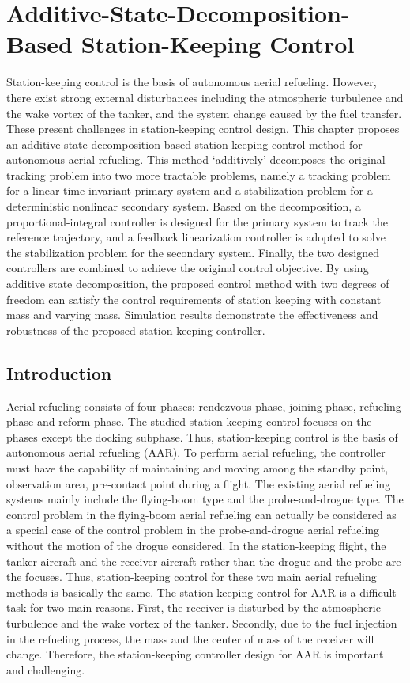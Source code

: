
\chapter{ Additive-State-Decomposition-Based Station-Keeping Control}

Station-keeping control is the basis of autonomous aerial refueling. However, there exist strong external disturbances including the atmospheric turbulence and the wake vortex of the
tanker, and the system change caused by the fuel transfer. These present challenges in station-keeping control design. This chapter proposes an additive-state-decomposition-based station-keeping control method for autonomous aerial refueling. This method `additively' decomposes the original tracking
problem into two more tractable problems, namely a tracking problem for a linear time-invariant primary system and a stabilization problem for a deterministic nonlinear secondary system. Based on the decomposition, a
proportional-integral controller is designed for the primary system to track the
reference trajectory, and a feedback linearization controller is adopted to solve the stabilization problem for the secondary system. Finally, the two
designed controllers are combined to achieve the original control objective. By using
additive state decomposition, the proposed control method with two degrees of freedom
can satisfy the control requirements of station keeping with constant mass and varying mass. Simulation results demonstrate the effectiveness and robustness of the proposed station-keeping controller.

\section{Introduction}

Aerial refueling consists of four
phases: rendezvous phase, joining phase, refueling phase and reform phase. The studied station-keeping control focuses on the phases except the docking subphase. Thus, station-keeping control is the
basis of autonomous aerial refueling (AAR). To perform aerial refueling, the
controller must have the capability of maintaining and moving among the
standby point, observation area, pre-contact point during a flight. The
existing aerial refueling systems mainly include the flying-boom type and the probe-and-drogue type. The control problem in
the flying-boom aerial refueling can actually be considered as a special
case of the control problem in the probe-and-drogue aerial refueling without
the motion of the drogue considered. In the station-keeping flight, the
tanker aircraft and the receiver aircraft rather than the drogue and the
probe are the focuses. Thus, station-keeping control for these two main
aerial refueling methods is basically the same. The station-keeping control
for AAR is a difficult task for two main reasons. First, the receiver is
disturbed by the atmospheric turbulence and the wake vortex of the tanker.
Secondly, due to the fuel injection in the refueling process, the mass and
the center of mass of the receiver will change. Therefore, the
station-keeping controller design for AAR is important and challenging.

